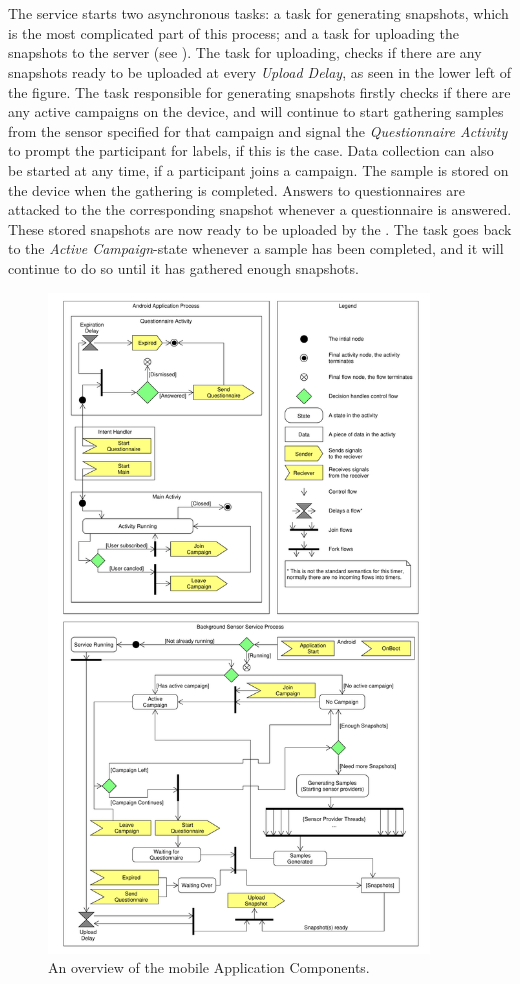 \\\\
The service starts two asynchronous tasks: a task for generating snapshots, which is the most complicated part of this process; and a task for uploading the snapshots to the server (see ). The task for uploading, checks if there are any snapshots ready to be uploaded at every \emph{Upload Delay}, as seen in the lower left of the figure. The task responsible for generating snapshots firstly checks if there are any active campaigns on the device, and will continue to start gathering samples from the sensor specified for that campaign and signal the \emph{Questionnaire Activity} to prompt the participant for labels, if this is the case. Data collection can also be started at any time, if a participant joins a campaign. The sample is stored on the device when the gathering is completed. Answers to questionnaires are attacked to the the corresponding snapshot whenever a questionnaire is answered. These stored snapshots are now ready to be uploaded by the . The task goes back to the \emph{Active Campaign}-state whenever a sample has been completed, and it will continue to do so until it has gathered enough snapshots.

\begin{figure}[!htbp]
    \centering
    \includegraphics[width=0.9\textwidth]{graphic/backgroundsensorservice/lifecyclestuff}
    \caption{An overview of the mobile Application Components.}
    \label{fig:system_currency_and_lifecycle}
\end{figure}
\FloatBarrier